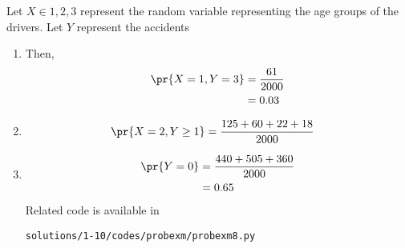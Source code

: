 Let $X \in {1,2,3}$ represent the random variable representing the age groups of the drivers. Let $Y$ represent the accidents
\begin{enumerate}
\item Then,
\begin{align}
\pr{X=1, Y = 3} &= \frac{61}{2000}
\\
&= 0.03
\end{align}
\item 
\begin{align}
\pr{X=2, Y \ge 1} &= \frac{125+60+22+18}{2000}
\end{align}
\item 
\begin{align}
\pr{Y = 0} &= \frac{440+505+360}{2000}
\\
&= 0.65
\end{align}
Related code is available in 
\begin{lstlisting}
solutions/1-10/codes/probexm/probexm8.py
\end{lstlisting}
\end{enumerate}
